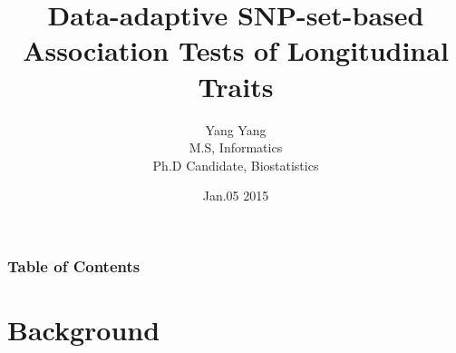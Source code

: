 \documentclass[compress]{beamer}
\begin{document}
\title[Amazon] %
{Data-adaptive SNP-set-based Association Tests of Longitudinal Traits}
\author[ Yang Yang] %
{
Yang Yang\\
M.S, Informatics\\
Ph.D Candidate, Biostatistics
}
\date[Jan.5 2015] %
{Jan.05 2015}


\frame{\titlepage}


\begin{frame}
\frametitle{Table of Contents}
\small
\tableofcontents
\end{frame}


\section{Background}
\end{document}
